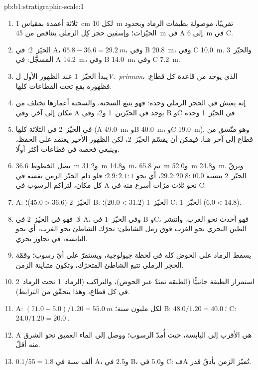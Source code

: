 \begin{solution}{pb:b1:stratigraphic-scale:1}
\begin{enumerate}
  \item ثلاثة أعمدة بمقياس \qty{1}{cm} لكل \qty{10}{m} تقريبًا، موصولة بطبقات الرماد وبحدود الحيّزات؛ وإسفين حجر كِل الرملي يتناقص من \qty{45}{m} في A إلى \qty{6}{m} في C.
  \item الحيّز~2: في A، $65.8 - 36.6 = \qty{29.2}{m}$، وفي B \qty{20.8}{m}، وفي C \qty{10.0}{m}. والحيّز~3 المسجَّل: في A \qty{14.2}{m}، وفي B \qty{14.0}{m}، وفي C \qty{7.2}{m}.
  \item يبدأ الحيّز~1 عند الظهور الأول ل\emph{V.~primum}، الذي يوجد من قاعدة كل قطاع: فظهوره يقع تحت القطاعات كلها.
  \item إنه يعيش في الحجر الرملي وحده: فهو يتبع السحنة، والسحنة أعمارها تختلف من مكان إلى آخر. وفي A يوجد في الحيّزين~1 و\num{2}، وفي B وC في الحيّز~1 وحده.
  \item في الحيّز~2 في الثلاثة كلها (A \qty{49.0}{m}، وB \qty{40.0}{m}، وC \qty{19.0}{m}). وهو متّسق من قطاع إلى آخر هنا، فيمكن أن يقسّم الحيّز~2، لكن الظهور الأخير يعتمد على الحفظ، وينبغي فحصه في قطاعات أكثر أولًا.
  \item تصل الخطوط \qty{36.6}{m} و\qty{31.2}{m} و\qty{14.8}{m}، ثم \qty{65.8}{m} و\qty{52.0}{m} و\qty{24.8}{m}. ويرقّ الحيّز~2 بنسبة $29.2 : 20.8 : 10.0$، أي نحو $2.9 : 2.1 : 1$: فلو دام الحيّز الزمن نفسه في كل مكان، لتراكم الرسوب في A نحو ثلاث مرّات أسرع منه في C.
  \item A: الحيّز~2 ($45.0 > 36.6$)؛ B: الحيّز~1 ($20.0 < 31.2$)؛ C: الحيّز~1 ($6.0 < 14.8$).
  \item لا: فهو في الحيّز~2 في A، وفي الحيّز~1 في B وC، فهو أحدث نحو الغرب. وانتشر الطين البحري نحو الغرب فوق رمل الشاطئ: تحرّك الشاطئ نحو الغرب، أي نحو اليابسة، في تجاوز بحري.
  \item يسقط الرماد على الحوض كله في لحظة جيولوجية، ويستقرّ على أيّ رسوب؛ وقمّة الحجر الرملي تتبع الشاطئ المتحرّك، وتكون متباينة الزمن.
  \item استمرار الطبقة جانبيًّا (الطبقة تمتدّ عبر الحوض)، والتراكب (الرماد~1 تحت الرماد~2 في كل قطاع، وهذا يتحقّق من الترابط).
  \item A: $(71.0 - 5.0)/1.20 = \qty{55.0}{m}$ لكل مليون سنة؛ B: $48.0/1.20 = \qty{40.0}{}$؛ C: $24.0/1.20 = \qty{20.0}{}$.
  \item A هي الأقرب إلى اليابسة، حيث أُمدّ الرسوب؛ ووصل إلى الماء العميق نحو الشرق منه أقلّ.
  \item $0.1/55 = \num{1.8}$ ألف سنة في A، و$\num{2.5}$ في B، و$\num{5.0}$ في C: فA تُميّز الزمن بأدقّ قدر.

\end{enumerate}
\end{solution}
